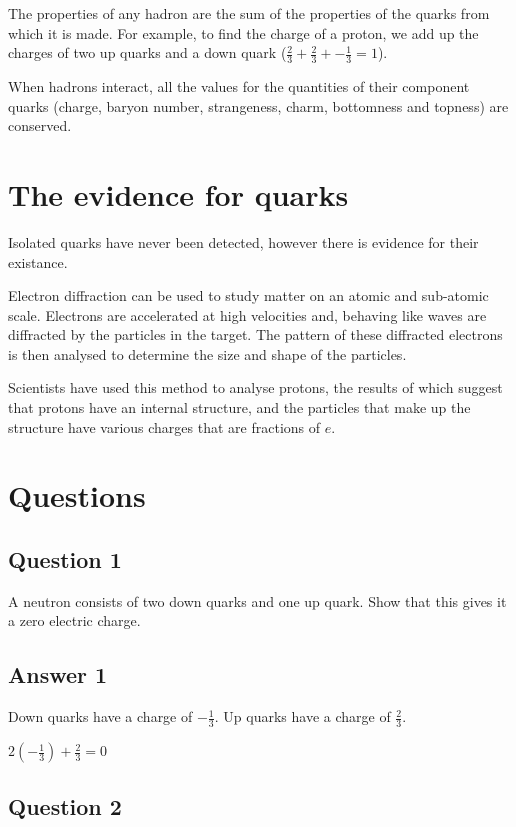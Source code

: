 \documentclass{article}
\begin{document}
The properties of any hadron are the sum of the properties of the quarks from
which it is made. For example, to find the charge of a proton, we add up the
charges of two up quarks and a down quark ($\frac{2}{3}+\frac{2}{3}+-\frac{1}{3}
= 1$).

When hadrons interact, all the values for the quantities of their
component quarks (charge, baryon number, strangeness, charm, bottomness and
topness) are conserved.

\section*{The evidence for quarks}

Isolated quarks have never been detected, however there is evidence for their
existance.

Electron diffraction can be used to study matter on an atomic and sub-atomic
scale. Electrons are accelerated at high velocities and, behaving like waves are
diffracted by the particles in the target. The pattern of these diffracted
electrons is then analysed to determine the size and shape of the particles.

Scientists have used this method to analyse protons, the results of which
suggest that protons have an internal structure, and the particles that make up
the structure have various charges that are fractions of $e$.

\section*{Questions}

\subsection*{Question 1}

A neutron consists of two down quarks and one up quark. Show that this gives it
a zero electric charge.

\subsection*{Answer 1}

Down quarks have a charge of $-\frac{1}{3}$. Up quarks have a charge of
$\frac{2}{3}$.

$2(-\frac{1}{3}) + \frac{2}{3} = 0$

\subsection*{Question 2}
\end{document}
